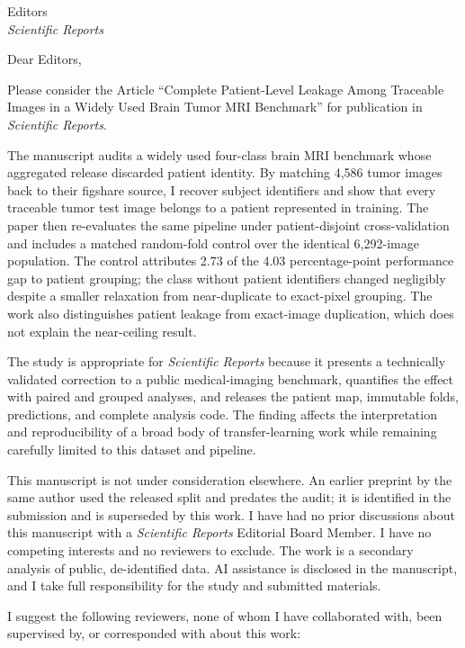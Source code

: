 \documentclass[11pt]{letter}
\date{\today}
\begin{document}
\begin{letter}{Editors\\\textit{Scientific Reports}}
\opening{Dear Editors,}

Please consider the Article ``Complete Patient-Level Leakage Among Traceable Images in a Widely Used Brain Tumor MRI Benchmark'' for publication in \textit{Scientific Reports}.

The manuscript audits a widely used four-class brain MRI benchmark whose aggregated release discarded patient identity. By matching 4,586 tumor images back to their figshare source, I recover subject identifiers and show that every traceable tumor test image belongs to a patient represented in training. The paper then re-evaluates the same pipeline under patient-disjoint cross-validation and includes a matched random-fold control over the identical 6,292-image population. The control attributes 2.73 of the 4.03 percentage-point performance gap to patient grouping; the class without patient identifiers changed negligibly despite a smaller relaxation from near-duplicate to exact-pixel grouping. The work also distinguishes patient leakage from exact-image duplication, which does not explain the near-ceiling result.

The study is appropriate for \textit{Scientific Reports} because it presents a technically validated correction to a public medical-imaging benchmark, quantifies the effect with paired and grouped analyses, and releases the patient map, immutable folds, predictions, and complete analysis code. The finding affects the interpretation and reproducibility of a broad body of transfer-learning work while remaining carefully limited to this dataset and pipeline.

This manuscript is not under consideration elsewhere. An earlier preprint by the same author used the released split and predates the audit; it is identified in the submission and is superseded by this work. I have had no prior discussions about this manuscript with a \textit{Scientific Reports} Editorial Board Member. I have no competing interests and no reviewers to exclude. The work is a secondary analysis of public, de-identified data. AI assistance is disclosed in the manuscript, and I take full responsibility for the study and submitted materials.

I suggest the following reviewers, none of whom I have collaborated with, been supervised by, or corresponded with about this work:


\end{letter}
\end{document}
